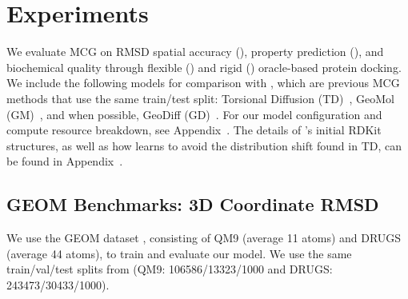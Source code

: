 \section{Experiments}


We evaluate MCG on RMSD spatial accuracy (), property prediction (), and biochemical quality through flexible () and rigid () oracle-based protein docking.
We include the following models for comparison with \modelns, which are previous MCG methods that use the same train/test split: Torsional Diffusion (TD)~\citep{torsional-diffusion}, GeoMol (GM)~\citep{GeoMol}, and when possible, GeoDiff (GD)~\citep{geodiff}.  
For our model configuration and compute resource breakdown, see Appendix~. 
The details of \modelns's initial RDKit structures, as well as how \model learns to avoid the distribution shift found in TD, can be found in Appendix~.

\subsection{GEOM Benchmarks: 3D Coordinate RMSD}
\label{sec:rmsd}
We use the GEOM dataset \citep{GEOM}, consisting of QM9 (average 11 atoms) and DRUGS (average 44 atoms), to train and evaluate our model. 
We use the same train/val/test splits from \citet{GeoMol} (QM9: 106586/13323/1000 and DRUGS: 243473/30433/1000).
